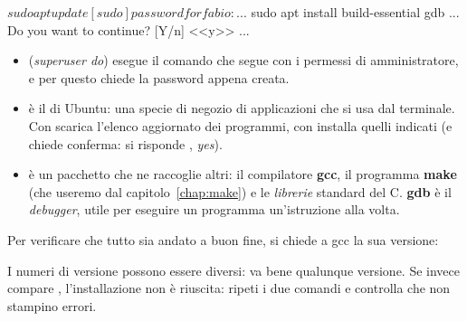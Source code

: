 \begin{console}[Ubuntu]
$ sudo apt update
[sudo] password for fabio:
...
$ sudo apt install build-essential gdb
...
Do you want to continue? [Y/n] <<y>>
...
\end{console}

\begin{itemize}
  \item {} (\textit{superuser do}) esegue il comando che segue
        con i permessi di amministratore, e per questo chiede la password
        appena creata.
  \item {} è il  di Ubuntu: una specie
        di negozio di applicazioni che si usa dal terminale. Con
         scarica l'elenco aggiornato dei programmi, con
         installa quelli indicati (e chiede conferma: si
        risponde , \textit{yes}).
  \item {} è un pacchetto che ne raccoglie altri:
        il compilatore \textbf{gcc}, il programma \textbf{make} (che useremo
        dal capitolo~\ref{chap:make}) e le \textit{librerie} standard del C.
        \textbf{gdb} è il \textit{debugger}, utile per eseguire un programma
        un'istruzione alla volta.
\end{itemize}

Per verificare che tutto sia andato a buon fine, si chiede a gcc la sua
versione:


I numeri di versione possono essere diversi: va bene qualunque versione.
Se invece compare , l'installazione non è
riuscita: ripeti i due comandi  e controlla che non stampino
errori.


